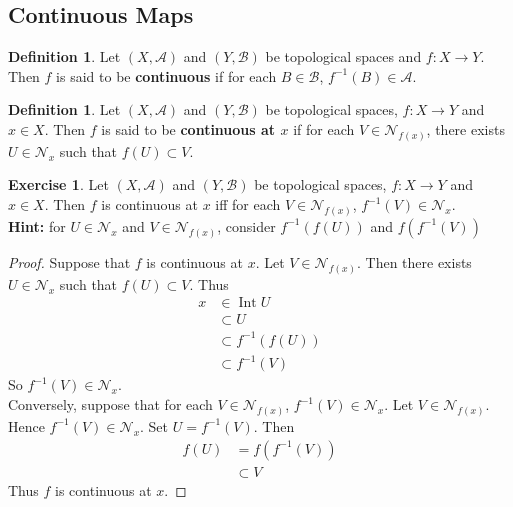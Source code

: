 \documentclass[12pt]{amsart}
\theoremstyle{definition}
\newtheorem{defn}[definition]{Definition}
\newtheorem{ex}[definition]{Exercise}
\newcommand{\MA}{\mathcal{A}}
\newcommand{\MB}{\mathcal{B}}
\newcommand{\MN}{\mathcal{N}}
\newcommand{\tbf}[1]{\textbf{#1}}
\DeclareMathOperator{\Int}{Int}
\DeclareMathOperator*{\0}{\mbf{0}}
\DeclareMathOperator*{\1}{\mbf{1}}
\newcommand{\lex}[1]{\label{ex:#1}}
\newcommand{\ld}[1]{\label{defn:#1}}
\begin{document}
	
	
	
	
	
	
	
	
	
	
	
	
	
	
	
	
	
	\newpage
	\subsection{Continuous Maps}	
	
	\begin{defn} \ld{}
	Let $(X,\MA)$ and $(Y,\MB)$ be topological spaces and $f:X \rightarrow Y$. Then $f$ is said to be \tbf{continuous} if for each $B \in \MB$, $f^{-1}(B) \in \MA$.
	\end{defn}
	
	\begin{defn} \ld{}
	Let $(X,\MA)$ and $(Y,\MB)$ be topological spaces, $f:X \rightarrow Y$ and $x \in X$. Then $f$ is said to be \tbf{continuous at $x$} if for each $V \in \MN_{f(x)}$, there exists $U \in \MN_x$ such that $f(U) \subset V$. 
	\end{defn}		
	
	\begin{ex} \lex{}
	Let $(X,\MA)$ and $(Y,\MB)$ be topological spaces, $f:X \rightarrow Y$ and $x \in X$. Then $f$ is continuous at $x$ iff for each $V \in \MN_{f(x)}$, $f^{-1}(V) \in \MN_{x}$.\\
	\tbf{Hint:} for $U \in \MN_x$ and $V \in \MN_{f(x)}$, consider $f^{-1}(f(U))$ and $f(f^{-1}(V))$
	\end{ex}
	
	\begin{proof}
	Suppose that $f$ is continuous at $x$. Let $V \in \MN_{f(x)}$. Then there exists $U \in \MN_x$ such that $f(U) \subset V$. Thus
	\begin{align*}
	x 
	&\in \Int U \\
	& \subset U \\
	&\subset f^{-1}(f(U)) \\
	&\subset f^{-1}(V)
	\end{align*}
	So $f^{-1}(V) \in \MN_x$.\\
	Conversely, suppose that for each $V \in \MN_{f(x)}$, $f^{-1}(V) \in \MN_{x}$. Let $V \in \MN_{f(x)}$. Hence $f^{-1}(V) \in \MN_{x}$. Set $U = f^{-1}(V)$. Then 
	\begin{align*}
	f(U) 
	&= f(f^{-1}(V)) \\
	& \subset V
	\end{align*}
	Thus $f$ is continuous at $x$.
	\end{proof}
	
\end{document}
